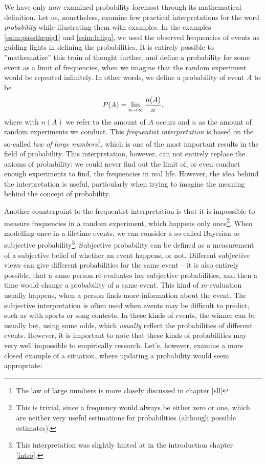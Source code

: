 \documentclass[12pt,a4paper,leqno]{report}
\theoremstyle{plain}
\theoremstyle{definition}
\begin{document}
We have only now examined probability foremost through its mathematical definition. Let us, nonetheless, examine few practical interpretations for the word \emph{probability} while illustrating them with examples. In the examples \ref{esim:passthepig1} and \ref{esim:laliga}, we used the observed frequencies of events as guiding lights in defining the probabilities. It is entirely possible to ''mathematize'' this train of thought further, and define a probability for some event as a limit of frequencies, when we imagine that the random experiment would be repeated infinitely. In other words, we define a probability of event $A$ to be
\begin{equation}\label{maar:frequentist_prob}\index{Probability!Frequentist Interpretation}
P(A) = \lim_{n \rightarrow \infty} \frac{n(A)}{n},
\end{equation}
where with $n(A)$ we refer to the amount of $A$ occurs and $n$ as the amount of random experiments we conduct. This \emph{frequentist interpretation} is based on the so-called \emph{law of large numbers}\footnote{The law of large numbers is more closely discussed in chapter \ref{sll}}, which is one of the most important results in the field of probability. This interpretation, however, can not entirely replace the axioms of probability: we could never find out the limit of, or even conduct enough experiments to find, the frequencies in real life. However, the idea behind the interpretation is useful, particularly when trying to imagine the meaning behind the concept of probability.

Another counterpoint to the frequentist interpretation is that it is impossible to measure frequencies in a random experiment, which happens only once\footnote{This is trivial, since a frequency would always be either zero or one, which are neither very useful estimations for probabilities (although possible estimates).}. When modelling once-in-a-lifetime events, we can consider a so-called Bayesian or subjective probability\footnote{This interpretation was slightly hinted at in the introduction chapter \ref{intro}.}. Subjective probability can be defined as a measurement of a subjective belief of whether an event happens, or not. Different subjective views can give different probabilities for the same event -- it is also entirely possible, that a same person re-evaluates her subjective probabilities, and then a time would change a probability of a same event. This kind of re-evaluation usually happens, when a person finds more information about the event. The subjective interpretation is often used when events may be difficult to predict, such as with sports or song contests. In these kinds of events, the winner can be usually bet, using some odds, which \emph{usually} reflect the probabilities of different events. However, it is important to note that these kinds of probabilities may very well impossible to empirically research. Let's, however, examine a more closed example of a situation, where updating a probability would seem appropriate:
\end{document}
